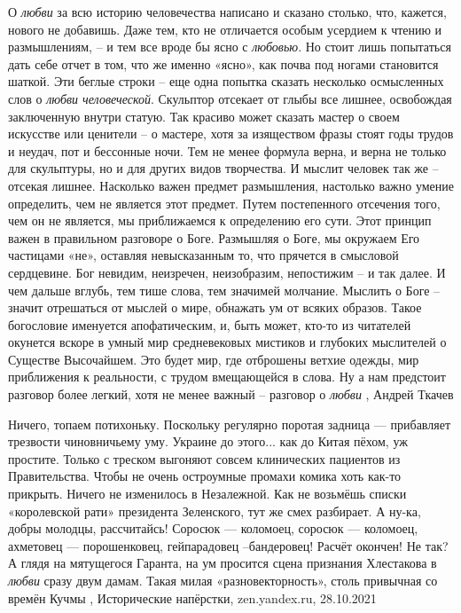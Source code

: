 О \emph{любви} за всю историю человечества написано и сказано столько, что, кажется,
нового не добавишь. Даже тем, кто не отличается особым усердием к чтению и
размышлениям, – и тем все вроде бы ясно с \emph{любовью}. Но стоит лишь попытаться
дать себе отчет в том, что же именно «ясно», как почва под ногами становится
шаткой.  Эти беглые строки – еще одна попытка сказать несколько осмысленных
слов о \emph{любви человеческой}.  Скульптор отсекает от глыбы все лишнее, освобождая
заключенную внутри статую.  Так красиво может сказать мастер о своем искусстве
или ценители – о мастере, хотя за изяществом фразы стоят годы трудов и неудач,
пот и бессонные ночи. Тем не менее формула верна, и верна не только для
скульптуры, но и для других видов творчества. И мыслит человек так же – отсекая
лишнее.  Насколько важен предмет размышления, настолько важно умение
определить, чем не является этот предмет. Путем постепенного отсечения того,
чем он не является, мы приближаемся к определению его сути.  Этот принцип важен
в правильном разговоре о Боге. Размышляя о Боге, мы окружаем Его частицами
«не», оставляя невысказанным то, что прячется в смысловой сердцевине. Бог
невидим, неизречен, неизобразим, непостижим – и так далее. И чем дальше вглубь,
тем тише слова, тем значимей молчание.  Мыслить о Боге – значит отрешаться от
мыслей о мире, обнажать ум от всяких образов. Такое богословие именуется
апофатическим, и, быть может, кто-то из читателей окунется вскоре в умный мир
средневековых мистиков и глубоких мыслителей о Существе Высочайшем. Это будет
мир, где отброшены ветхие одежды, мир приближения к реальности, с трудом
вмещающейся в слова.  Ну а нам предстоит разговор более легкий, хотя не менее
важный – разговор о \emph{любви}
, Андрей Ткачев

Ничего, топаем потихоньку. Поскольку регулярно поротая задница — прибавляет
трезвости чиновничьему уму. Украине до этого... как до Китая пёхом, уж простите.
Только с треском выгоняют совсем клинических пациентов из Правительства. Чтобы
не очень остроумные промахи комика хоть как-то прикрыть.  Ничего не изменилось
в Незалежной. Как не возьмёшь списки «королевской рати» президента Зеленского,
тут же смех разбирает. А ну-ка, добры молодцы, рассчитайсь! Соросюк — коломоец,
соросюк — коломоец, ахметовец — порошенковец, гейпарадовец –бандеровец! Расчёт
окончен! Не так? А глядя на мятущегося Гаранта, на ум просится сцена признания
Хлестакова в \emph{любви} сразу двум дамам. Такая милая «разновекторность», столь
привычная со времён Кучмы
, 
Исторические напёрстки, zen.yandex.ru, 28.10.2021

